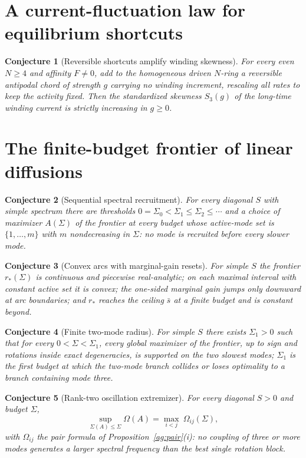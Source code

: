 \documentclass[11pt]{article}
\newtheorem{conjecture}{Conjecture}
\theoremstyle{definition}
\begin{document}
\section{A current-fluctuation law for equilibrium shortcuts}

\begin{conjecture}[Reversible shortcuts amplify winding skewness]\label{ag1}
For every even $N\ge4$ and affinity $F\ne0$, add to the homogeneous driven $N$-ring a reversible antipodal chord of strength $g$ carrying no winding increment, rescaling all rates to keep the activity fixed.  Then the standardized skewness $S_3(g)$ of the long-time winding current is strictly increasing in $g\ge0$.
\end{conjecture}

\section{The finite-budget frontier of linear diffusions}

\begin{conjecture}[Sequential spectral recruitment]\label{ag2}
For every diagonal $S$ with simple spectrum there are thresholds $0=\Sigma_0<\Sigma_1\le\Sigma_2\le\cdots$ and a choice of maximizer $A(\Sigma)$ of the frontier at every budget whose active-mode set is $\{1,\ldots,m\}$ with $m$ nondecreasing in $\Sigma$: no mode is recruited before every slower mode.
\end{conjecture}

\begin{conjecture}[Convex arcs with marginal-gain resets]\label{ag3}
For simple $S$ the frontier $r_*(\Sigma)$ is continuous and piecewise real-analytic; on each maximal interval with constant active set it is convex; the one-sided marginal gain jumps only downward at arc boundaries; and $r_*$ reaches the ceiling $\bar s$ at a finite budget and is constant beyond.
\end{conjecture}

\begin{conjecture}[Finite two-mode radius]\label{ag4}
For simple $S$ there exists $\Sigma_1>0$ such that for every $0<\Sigma<\Sigma_1$, every global maximizer of the frontier, up to sign and rotations inside exact degeneracies, is supported on the two slowest modes; $\Sigma_1$ is the first budget at which the two-mode branch collides or loses optimality to a branch containing mode three.
\end{conjecture}

\begin{conjecture}[Rank-two oscillation extremizer]\label{ag5}
For every diagonal $S>0$ and budget $\Sigma$,
\[
\sup_{\Sigma(A)\le\Sigma}\Omega(A)=\max_{i<j}\ \Omega_{ij}(\Sigma),
\]
with $\Omega_{ij}$ the pair formula of Proposition~\ref{ag:pair}(i): no coupling of three or more modes generates a larger spectral frequency than the best single rotation block.
\end{conjecture}
\end{document}
